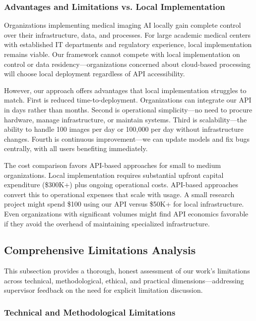 \documentclass[12pt,a4paper]{article}
\begin{document}
\subsubsection{Advantages and Limitations vs. Local Implementation}

Organizations implementing medical imaging AI locally gain complete control over their infrastructure, data, and processes. For large academic medical centers with established IT departments and regulatory experience, local implementation remains viable. Our framework cannot compete with local implementation on control or data residency—organizations concerned about cloud-based processing will choose local deployment regardless of API accessibility.

However, our approach offers advantages that local implementation struggles to match. First is reduced time-to-deployment. Organizations can integrate our API in days rather than months. Second is operational simplicity—no need to procure hardware, manage infrastructure, or maintain systems. Third is scalability—the ability to handle 100 images per day or 100,000 per day without infrastructure changes. Fourth is continuous improvement—we can update models and fix bugs centrally, with all users benefiting immediately.

The cost comparison favors API-based approaches for small to medium organizations. Local implementation requires substantial upfront capital expenditure (\$300K+) plus ongoing operational costs. API-based approaches convert this to operational expenses that scale with usage. A small research project might spend \$100 using our API versus \$50K+ for local infrastructure. Even organizations with significant volumes might find API economics favorable if they avoid the overhead of maintaining specialized infrastructure.

\subsection{Comprehensive Limitations Analysis}

This subsection provides a thorough, honest assessment of our work's limitations across technical, methodological, ethical, and practical dimensions—addressing supervisor feedback on the need for explicit limitation discussion.

\subsubsection{Technical and Methodological Limitations}
\end{document}
